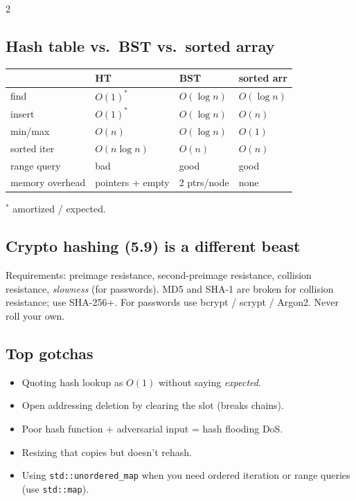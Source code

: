 \documentclass[10pt]{article}
\begin{document}
\begin{multicols}{2}
\subsection*{Hash table vs.\ BST vs.\ sorted array}
\begin{tabular}{@{}l|lll@{}}
                      & \textbf{HT}       & \textbf{BST}      & \textbf{sorted arr}\\
\hline
find                  & $O(1)^*$          & $O(\log n)$       & $O(\log n)$\\
insert                & $O(1)^*$          & $O(\log n)$       & $O(n)$\\
min/max               & $O(n)$            & $O(\log n)$       & $O(1)$\\
sorted iter           & $O(n \log n)$     & $O(n)$            & $O(n)$\\
range query           & bad               & good              & good\\
memory overhead       & pointers + empty  & 2 ptrs/node       & none
\end{tabular}
$^*$ amortized / expected.

\subsection*{Crypto hashing (5.9) is a different beast}
Requirements: preimage resistance, second-preimage resistance, collision
resistance, \emph{slowness} (for passwords). MD5 and SHA-1 are broken
for collision resistance; use SHA-256+. For passwords use bcrypt /
scrypt / Argon2. Never roll your own.

\subsection*{Top gotchas}
\begin{itemize}
    \item Quoting hash lookup as $O(1)$ without saying \emph{expected}.
    \item Open addressing deletion by clearing the slot (breaks chains).
    \item Poor hash function + adversarial input = hash flooding DoS.
    \item Resizing that copies but doesn't rehash.
    \item Using \texttt{std::unordered\_map} when you need ordered
    iteration or range queries (use \texttt{std::map}).
\end{itemize}

\end{multicols}
\end{document}
